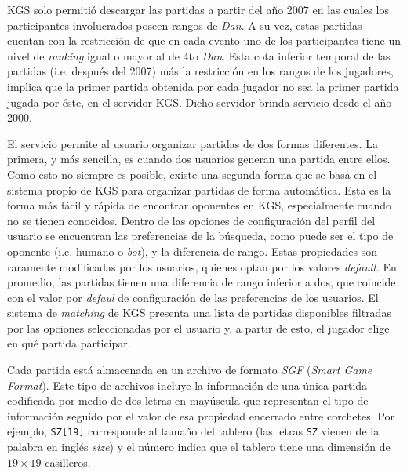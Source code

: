 \documentclass[11pt,twoside, spanish]{report} %
\begin{document}
KGS solo permiti\'o descargar las partidas a partir del a\~no 2007 en las cuales los participantes involucrados poseen rangos de \textit{Dan}.
A su vez, estas partidas cuentan con la restricci\'on de que en cada evento uno de los participantes tiene un nivel de \textit{ranking} igual o mayor al de 4to \textit{Dan}.
Esta cota inferior temporal de las partidas (i.e. despu\'es del 2007) m\'as la restricci\'on en los rangos de los jugadores, implica que la primer partida obtenida por cada jugador no sea la primer partida jugada por \'este, en el servidor KGS.
Dicho servidor brinda servicio desde el a\~no 2000.


El servicio permite al usuario organizar partidas de dos formas diferentes.
La primera, y m\'as sencilla, es cuando dos usuarios generan una partida entre ellos.
Como esto no siempre es posible, existe una segunda forma que se basa en el sistema propio de KGS para organizar partidas de forma autom\'atica.
Esta es la forma m\'as f\'acil y r\'apida de encontrar oponentes en KGS, especialmente cuando no se tienen conocidos.
Dentro de las opciones de configuraci\'on del perfil del usuario se encuentran las preferencias de la b\'usqueda, como puede ser el tipo de oponente (i.e. humano o \textit{bot}), y la diferencia de rango. 
Estas propiedades son raramente modificadas por los usuarios, quienes optan por los valores \emph{default}. 
En promedio, las partidas tienen una diferencia de rango inferior a dos, que coincide con el valor por \emph{defaul} de configuraci\'on de las preferencias de los usuarios.
El sistema de \emph{matching} de KGS presenta una lista de partidas disponibles filtradas por las opciones seleccionadas por el usuario y, a partir de esto, el jugador elige en qu\'e partida participar.

Cada partida est\'a almacenada en un archivo de formato \textit{SGF} (\textit{Smart Game Format}).
Este tipo de archivos incluye la informaci\'on de una \'unica partida codificada por medio de dos letras en may\'uscula que representan el tipo de informaci\'on seguido por el valor de esa propiedad encerrado entre corchetes.
Por ejemplo, \verb|SZ[19]| corresponde al tama\~no del tablero (las letras \verb|SZ| vienen de la palabra en ingl\'es \textit{size}) y el n\'umero indica que el tablero tiene una dimensi\'on de $19\times19$ casilleros.
\end{document}
